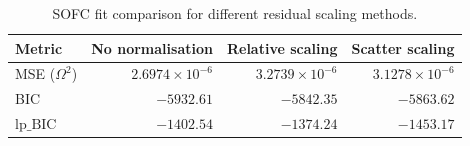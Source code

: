 \documentclass[
    11pt,
    a4paper,
    oneside
]{article}
\begin{document}
\begin{table}[htbp]
\centering
\caption{SOFC fit comparison for different residual scaling methods.}
\label{tab:sofc_scaling_comparison}
\begin{tabular}{lrrr}
\toprule
Metric & No normalisation & Relative scaling & Scatter scaling \\
\midrule
MSE ($\Omega^2$)       & $2.6974\times10^{-6}$ & $3.2739\times10^{-6}$ & $3.1278\times10^{-6}$ \\
BIC                    & $-5932.61$ & $-5842.35$ & $-5863.62$ \\
$\mathrm{lp\_BIC}$     & $-1402.54$ & $-1374.24$ & $-1453.17$ \\
\bottomrule
\end{tabular}
\end{table}



%
%
%
\end{document}
